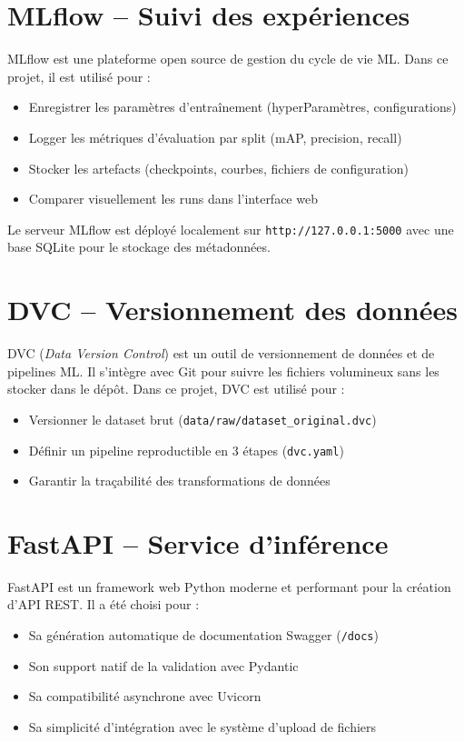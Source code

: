 \documentclass[a4paper,12pt]{report}
\begin{document}
\section{MLflow -- Suivi des exp\'eriences}
MLflow est une plateforme open source de gestion du cycle de vie ML. Dans ce projet, il est utilis\'e pour :
\begin{itemize}
\item Enregistrer les param\`etres d'entra\^inement (hyperParam\`etres, configurations)
\item Logger les m\'etriques d'\'evaluation par split (mAP, precision, recall)
\item Stocker les artefacts (checkpoints, courbes, fichiers de configuration)
\item Comparer visuellement les runs dans l'interface web
\end{itemize}
Le serveur MLflow est d\'eploy\'e localement sur \texttt{http://127.0.0.1:5000} avec une base SQLite pour le stockage des m\'etadonn\'ees.

\section{DVC -- Versionnement des donn\'ees}
DVC (\textit{Data Version Control}) est un outil de versionnement de donn\'ees et de pipelines ML. Il s'int\`egre avec Git pour suivre les fichiers volumineux sans les stocker dans le d\'ep\^ot. Dans ce projet, DVC est utilis\'e pour :
\begin{itemize}
\item Versionner le dataset brut (\texttt{data/raw/dataset\_original.dvc})
\item D\'efinir un pipeline reproductible en 3 \'etapes (\texttt{dvc.yaml})
\item Garantir la tra\c{c}abilit\'e des transformations de donn\'ees
\end{itemize}

\section{FastAPI -- Service d'inf\'erence}
FastAPI est un framework web Python moderne et performant pour la cr\'eation d'API REST. Il a \'et\'e choisi pour :
\begin{itemize}
\item Sa g\'en\'eration automatique de documentation Swagger (\texttt{/docs})
\item Son support natif de la validation avec Pydantic
\item Sa compatibilit\'e asynchrone avec Uvicorn
\item Sa simplicit\'e d'int\'egration avec le syst\`eme d'upload de fichiers
\end{itemize}
\end{document}

